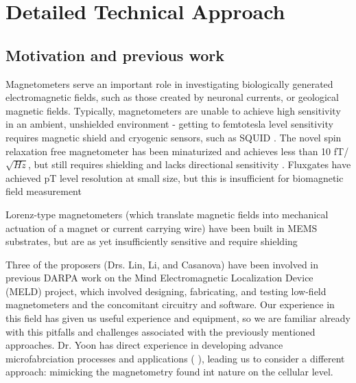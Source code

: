 \section{Detailed Technical Approach}

\subsection{Motivation and previous work}

Magnetometers serve an important role in investigating biologically generated electromagnetic fields, such as those created by neuronal currents, or geological magnetic fields. Typically, magnetometers are unable to achieve high sensitivity in an ambient, unshielded environment - getting to femtotesla level sensitivity requires magnetic shield and cryogenic sensors, such as SQUID \cite{lenz2006magnetic}. The novel spin relaxation free magnetometer has been minaturized and achieves less than 10 fT/$\sqrt{Hz}$, but still requires shielding and lacks directional sensitivity \cite{shah2013compact}. Fluxgates have achieved pT level resolution at small size, but this is insufficient for biomagnetic field measurement \cite{sasada2002orthogonal,uchiyama2014highly,sasada2014fundamental} 

Lorenz-type magnetometers (which translate magnetic fields into mechanical actuation of a magnet or current carrying wire) have been built in MEMS substrates, but are as yet insufficiently sensitive and require shielding \cite{sinha201627,kyynarainen20083d,kumar2015ultra,thompson2009parametrically}

Three of the proposers (Drs. Lin, Li, and Casanova) have been involved in previous DARPA work on the Mind Electromagnetic Localization Device (MELD) project, which involved designing, fabricating, and testing low-field magnetometers and the concomitant circuitry and software. Our experience in this field has given us useful experience and equipment, so we are familiar already with this pitfalls and challenges associated with the previously mentioned approaches. Dr. Yoon has direct experience in developing advance microfabrciation processes and applications (
\cite{yoon2003reduced,yoon2006multidirectional}), leading us to consider a different approach: mimicking the magnetometry found int nature on the cellular level.

